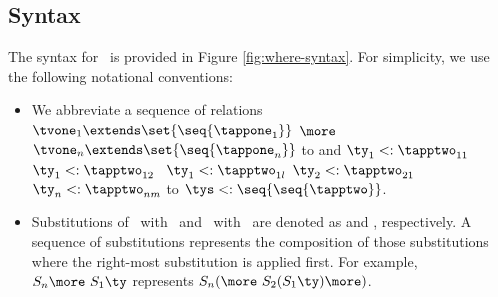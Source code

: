 %
%
%
%

\subsection{Syntax}\label{where-syntax}

The syntax for \wherecore\ is provided in Figure \ref{fig:where-syntax}.
For simplicity, we use the following notational conventions:
\begin{itemize}
\renewcommand{\subtype}{\ensuremath{<:}}
\item
We abbreviate a sequence of relations
$\tvone_1 \extends \set{\seq{\tappone_1}}$ $\more$ $\tvone_n \extends
  \set{\seq{\tappone_n}}$ to \seq{\tvone \extends \set{\seq{\tappone}}} and
$\ty_1\subtype\tapptwo_{11}$ \mbox{$\ty_1\subtype\tapptwo_{12}$} \more\
$\ty_1\subtype\tapptwo_{1l}$ $\ty_2\subtype\tapptwo_{21}$ \more\
$\ty_n\subtype\tapptwo_{nm}$ to $\tys\subtype\seq{\seq{\tapptwo}}$.
\renewcommand{\subtype}{\ensuremath{\:<:\:}}

\item
Substitutions of \vname\ with \val\ and \tvone\ with \ty\ are denoted
as \subst{\val}{\vname} and \subst{\ty}{\tvone}, respectively.
A sequence of substitutions represents the composition of those
substitutions where the right-most substitution is applied first.
For example, $S_n \more\ S_1 \ty$ represents
$S_n (\more\ S_2(S_1 \ty)\more)$.
\end{itemize}

